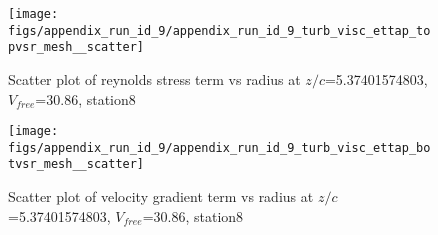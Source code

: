 \begin{figure}[H]
\centering
\texttt{[image: figs/appendix\_run\_id\_9/appendix\_run\_id\_9\_turb\_visc\_ettap\_topvsr\_mesh\_\_scatter]}
\caption{Scatter plot of reynolds stress term vs radius at $z/c$=5.37401574803, $V_{free}$=30.86, station8}
\label{fig:appendix_run_id_9_turb_visc_ettap_topvsr_mesh__scatter}
\end{figure}


\begin{figure}[H]
\centering
\texttt{[image: figs/appendix\_run\_id\_9/appendix\_run\_id\_9\_turb\_visc\_ettap\_botvsr\_mesh\_\_scatter]}
\caption{Scatter plot of velocity gradient term vs radius at $z/c$=5.37401574803, $V_{free}$=30.86, station8}
\label{fig:appendix_run_id_9_turb_visc_ettap_botvsr_mesh__scatter}
\end{figure}


